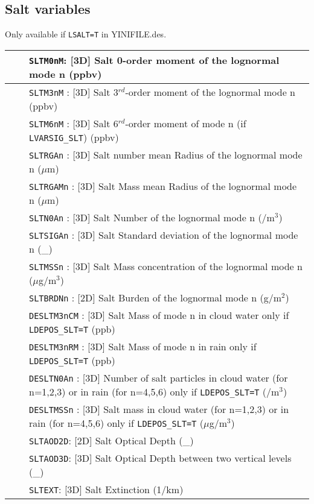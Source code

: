 \subsection{Salt variables}
Only available if \verb|LSALT=T| in YINIFILE.des.
\begin{center}
\begin{tabular}{|>{\centering}p{3cm}|>{\centering}p{2.5cm}|p{11cm}|}
\hline
\multirow{23}{*}{by default}& &{\tt SLTM0nM}: [3D] Salt 0-order moment of the lognormal mode n (ppbv)\\\cline{3-3}
& &{\tt SLTM3nM} : [3D] Salt 3$^{rd}$-order moment of the lognormal mode n (ppbv)\\\cline{3-3}
& &{\tt SLTM6nM} : [3D] Salt 6$^{rd}$-order moment of mode n 
              {\small(if {\tt LVARSIG\_SLT})} (ppbv)\\\cline{3-3}
& &{\tt SLTRGAn} : [3D] Salt number mean Radius of the lognormal mode n ($\mu$m)
\\\cline{3-3}
& &{\tt SLTRGAMn} : [3D] Salt Mass mean Radius of the lognormal mode n ($\mu$m)\\\cline{3-3}
& &{\tt SLTN0An} : [3D] Salt Number of the lognormal mode n (/m$^3$)\\\cline{3-3}
& &{\tt SLTSIGAn} : [3D] Salt Standard deviation of the lognormal mode n (\_)\\\cline{3-3}
& &{\tt SLTMSSn} : [3D] Salt Mass concentration of the lognormal mode n 
($\mu$g/m$^3$)\\\cline{3-3}
& &{\tt SLTBRDNn} : [2D] Salt Burden of the lognormal mode n (g/m$^2$)\\\cline{3-3}
& &{\tt DESLTM3nCM}  : [3D] Salt Mass of mode n in cloud water only if \verb|LDEPOS_SLT=T| (ppb) \\\cline{3-3}
& &{\tt DESLTM3nRM}  : [3D] Salt  Mass of mode n in rain only if \verb|LDEPOS_SLT=T| (ppb)\\\cline{3-3}
& &{\tt DESLTN0An} : [3D] Number of salt particles in cloud water (for n=1,2,3) or in rain (for n=4,5,6) only if \verb|LDEPOS_SLT=T|  (/m$^3$)\\\cline{3-3}
& &{\tt DESLTMSSn} : [3D] Salt mass in cloud water (for n=1,2,3) or in rain (for n=4,5,6) only if \verb|LDEPOS_SLT=T| ($\mu$g/m$^3$)\\\cline{1-3}
\multirow{3}{*}{NRAD\_3D}& \multirow{3}{*}{$\ge$ 1}&{\tt SLTAOD2D}: [2D] Salt Optical Depth (\_)\\\cline{3-3}
& &{\tt SLTAOD3D}: [3D] Salt Optical Depth between two vertical levels (\_)
\\\cline{3-3}
& &{\tt SLTEXT}: [3D] Salt Extinction (1/km)\\\hline
\end{tabular} 
\end{center}


